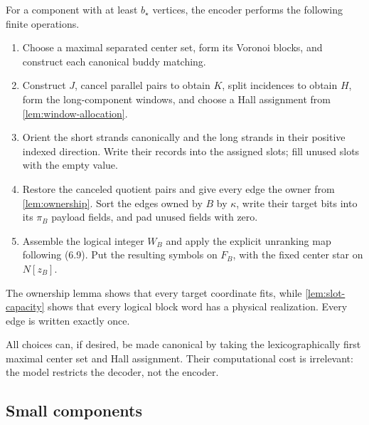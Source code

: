 \documentclass[11pt]{article}
\theoremstyle{definition}
\theoremstyle{remark}
\begin{document}
For a component with at least $b_\star$ vertices, the encoder performs the
following finite operations.
\begin{enumerate}[leftmargin=2.1em]
\item Choose a maximal separated center set, form its Voronoi blocks, and
      construct each canonical buddy matching.
\item Construct $J$, cancel parallel pairs to obtain $K$, split incidences
      to obtain $H$, form the long-component windows, and choose a Hall
      assignment from \cref{lem:window-allocation}.
\item Orient the short strands canonically and the long strands in their
      positive indexed direction.  Write their records into the assigned
      slots; fill unused slots with the empty value.
\item Restore the canceled quotient pairs and give every edge the owner from
      \cref{lem:ownership}.  Sort the edges owned by $B$ by $\kappa$, write
      their target bits into its $\pi_B$ payload fields, and pad unused
      fields with zero.
\item Assemble the logical integer $W_B$ and apply the explicit unranking map
      following (6.9).  Put the resulting symbols on $F_B$, with the fixed
      center star on $N[z_B]$.
\end{enumerate}
The ownership lemma shows that every target coordinate fits, while
\cref{lem:slot-capacity} shows that every logical block word has a physical
realization.  Every edge is written exactly once.

All choices can, if desired, be made canonical by taking the lexicographically
first maximal center set and Hall assignment.  Their computational cost is
irrelevant: the model restricts the decoder, not the encoder.

\subsection{Small components}
\label{sec:small}
\end{document}
